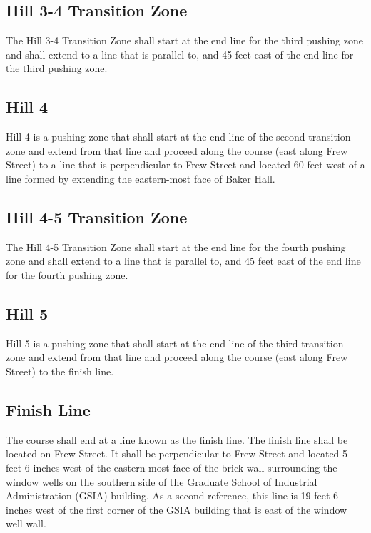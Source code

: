 \subsection{Hill 3-4 Transition Zone}

	The Hill 3-4 Transition Zone shall start at the end line for the third pushing zone and 
	shall extend to a line that is parallel to, and 45 feet east of the end line for the third
	pushing zone.

\subsection{Hill 4}

	Hill 4 is a pushing zone that shall start at the end line of the second transition zone 
	and extend from that line and proceed along the course (east along Frew Street) to 
	a line that is perpendicular to	Frew Street and located 60 feet west of a line formed by 
	extending the eastern-most face of Baker Hall.

\subsection{Hill 4-5 Transition Zone}

	The Hill 4-5 Transition Zone shall start at the end line for the fourth pushing zone and 
	shall extend to a line that is parallel to, and 45 feet east of the end line for the fourth
	pushing zone.

\subsection{Hill 5}

	Hill 5 is a pushing zone that shall start at the end line of the third transition 
	zone and extend from that line and proceed along the course (east along Frew 
	Street) to the finish line.

\subsection{Finish Line}

	The course shall end at a line known as the finish line. The finish line shall
	be located on Frew Street. It shall be perpendicular to Frew Street and located
	5 feet 6 inches west of the eastern-most face of the brick wall surrounding the
	window wells on the southern side of the Graduate School of Industrial
	Administration (GSIA) building. As a second reference, this line is 19 feet 6
	inches west of the first corner of the GSIA building that is east of the window
	well wall.


